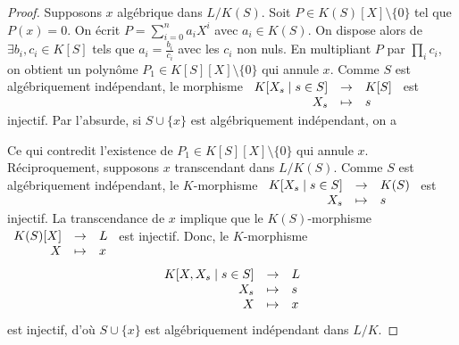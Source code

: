 \documentclass{article}
\newcommand{\applic}[4]{\begin{array}[t]{rcl}
#1 & \to & #2 \\
#3 & \mapsto & #4
\end{array}}
\theoremstyle{plain}
\theoremstyle{definition}
\theoremstyle{remark}
\begin{document}
\begin{proof}
    Supposons $x$ algébrique dans $L/K(S)$. Soit $P \in K(S)[X] \setminus \{0\}$ tel que $P(x) = 0$. On écrit $P = \sum\limits_{i=0}^n a_i X^i$ avec $a_i \in K(S)$. On dispose alors de $\exists b_i, c_i \in K[S]$ tels que $a_i = \frac{b_i}{c_i}$ avec les $c_i$ non nuls. En multipliant $P$ par $\prod\limits_{i} c_i$, on obtient un polynôme $P_1 \in K[S][X] \setminus\{0\}$ qui annule $x$. Comme $S$ est algébriquement indépendant, le morphisme $\applic{K[X_s \mid s \in S]}{K[S]}{X_s}{s}$ est injectif. Par l'absurde, si $S \cup \{x\}$ est algébriquement indépendant, on a
    \begin{center}
    \end{center}
    Ce qui contredit l'existence de $P_1 \in K[S][X] \setminus\{0\}$ qui annule $x$. \\
    Réciproquement, supposons $x$ transcendant dans $L/K(S)$. Comme $S$ est algébriquement indépendant, le $K$-morphisme $\applic{K[X_s \mid s\in S]}{K(S)}{X_s}{s}$ est injectif. La transcendance de $x$ implique que le $K(S)$-morphisme $\applic{K(S)[X]}{L}{X}{x}$ est injectif. Donc, le $K$-morphisme
    \[
        \begin{array}[t]{rcl}
            K[X,X_s \mid s\in S] & \to & L \\
            X_s & \mapsto & s \\
            X & \mapsto & x
            \end{array}
    \]
    est injectif, d'où $S \cup \{x\}$ est algébriquement indépendant dans $L/K$.
\end{proof}
\end{document}
